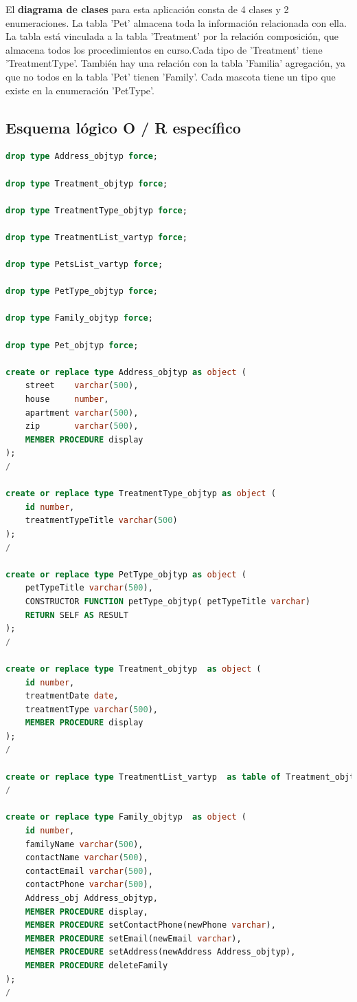\documentclass{FR16}
\begin{document}
\newpage

El \textbf{diagrama de clases} para esta aplicación consta de 4 clases y 2 enumeraciones. La tabla 'Pet' almacena toda la información relacionada con ella. La tabla está vinculada a la tabla 'Treatment' por la relación composición, que almacena todos los procedimientos en curso.Cada tipo de 'Treatment' tiene 'TreatmentType'. También hay una relación con la tabla 'Familia' agregación, ya que no todos en la tabla 'Pet'   tienen 'Family'. Cada mascota tiene un tipo que existe en la enumeración 'PetType'.

\subsection{Esquema lógico O / R específico}
\begin{justify}

\begin{lstlisting}[language=Sql, basicstyle=\scriptsize]
drop type Address_objtyp force;

drop type Treatment_objtyp force;

drop type TreatmentType_objtyp force;

drop type TreatmentList_vartyp force;

drop type PetsList_vartyp force;

drop type PetType_objtyp force;

drop type Family_objtyp force;

drop type Pet_objtyp force;

create or replace type Address_objtyp as object (
    street    varchar(500),
    house     number,
    apartment varchar(500),
    zip       varchar(500),
    MEMBER PROCEDURE display
);
/

create or replace type TreatmentType_objtyp as object (
    id number,
    treatmentTypeTitle varchar(500)
);
/

create or replace type PetType_objtyp as object (
    petTypeTitle varchar(500),
    CONSTRUCTOR FUNCTION petType_objtyp( petTypeTitle varchar)
    RETURN SELF AS RESULT
);
/

create or replace type Treatment_objtyp  as object (
    id number,
    treatmentDate date,
    treatmentType varchar(500),
    MEMBER PROCEDURE display
);
/

create or replace type TreatmentList_vartyp  as table of Treatment_objtyp;
/

create or replace type Family_objtyp  as object (
    id number,
    familyName varchar(500),
    contactName varchar(500),
    contactEmail varchar(500),
    contactPhone varchar(500),
    Address_obj Address_objtyp,
    MEMBER PROCEDURE display,
    MEMBER PROCEDURE setContactPhone(newPhone varchar),
    MEMBER PROCEDURE setEmail(newEmail varchar),
    MEMBER PROCEDURE setAddress(newAddress Address_objtyp),
    MEMBER PROCEDURE deleteFamily
);
/


\end{lstlisting}
\end{justify}
\end{document}
